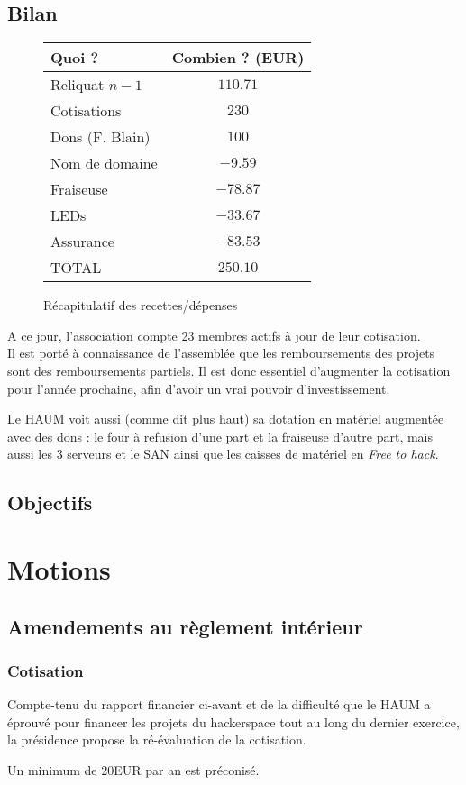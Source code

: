 \documentclass[a4paper, 11pt]{article}
\begin{document}
\subsection{Bilan}

\begin{figure}[h]
\centering
\begin{tabular}{l|c}
Quoi ? & Combien ? (EUR)  \\\hline
Reliquat $n-1$ & $110.71$\\
Cotisations & $230$ \\
Dons (F. Blain) & $100$ \\
Nom de domaine & $-9.59$\\
Fraiseuse & $-78.87$\\
LEDs & $-33.67$\\
Assurance & $-83.53$\\\hline\hline
TOTAL & $250.10$\\
\end{tabular}
\caption{Récapitulatif des recettes/dépenses}
\end{figure}

A ce jour, l'association compte 23 membres actifs à jour de leur cotisation. \\

Il est porté à connaissance de l'assemblée que les remboursements des projets sont des remboursements partiels. Il est donc essentiel d'augmenter la cotisation pour l'année prochaine, afin d'avoir un vrai pouvoir d'investissement.

Le HAUM voit aussi (comme dit plus haut) sa dotation en matériel augmentée avec des dons : le four à refusion d'une part
et la fraiseuse d'autre part, mais aussi les 3 serveurs et le SAN ainsi que les caisses de matériel en \textit{Free to
hack}.

\subsection{Objectifs}


\section{Motions}

\subsection{Amendements au règlement intérieur}

\subsubsection{Cotisation}

Compte-tenu du rapport financier ci-avant et de la difficulté que le HAUM a éprouvé pour financer les projets du hackerspace tout au long du dernier exercice, la présidence propose la ré-évaluation de la cotisation.

Un minimum de 20EUR par an est préconisé.
\end{document}
